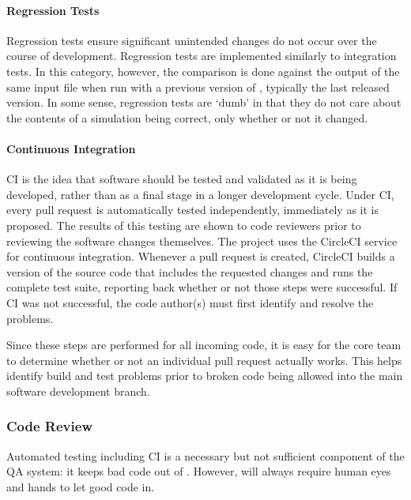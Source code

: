 \paragraph{Regression Tests}

Regression tests ensure significant unintended changes do not
occur over the course of \Cyclus development.
Regression tests are implemented similarly to integration tests.
In this category, however, the comparison is done against
the output of the same input file when run with a previous version of \Cyclus,
typically the last released version.
In some sense, regression tests are `dumb' in that they do
not care about the contents of a simulation being correct, only whether or not
it changed.

\paragraph{Continuous Integration}

\Gls{CI} is the idea that software should be tested
and validated as it is being developed, rather than as a final stage in a
longer development cycle.  Under \gls{CI}, every pull request is automatically
tested independently, immediately as it is proposed. The results of this
testing are shown to code reviewers prior to reviewing the software changes themselves.  The \Cyclus
project uses the CircleCI \cite{biggar_circleci_2015} service for continuous integration.
Whenever a pull request is created, CircleCI builds a version of the \Cyclus
source code that includes the requested changes and runs the complete test
suite, reporting back whether or not those steps were successful. If \gls{CI}
was not successful, the code author(s) must first identify and resolve the
problems.

Since these steps are performed for all incoming code, it is easy for the
\Cyclus core team to determine whether or not an individual pull request
actually works. This helps identify build and test problems prior to broken
code being allowed into the main software development branch.  

\subsubsection{Code Review}
\label{sec:qa-review}

Automated testing including \gls{CI} is a necessary but not sufficient
component of the \Cyclus \gls{QA} system: it keeps bad code out of
\Cyclus. However, \Cyclus will always require human eyes and hands to let good
code in.  

